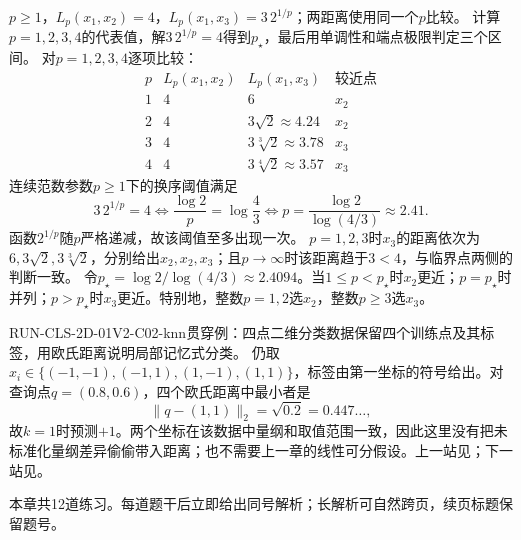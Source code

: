 \label{struct:V2-C02-CH33}
\begin{solution}
\SolGiven $p\ge1$，$L_p(x_1,x_2)=4$，$L_p(x_1,x_3)=3\,2^{1/p}$；两距离使用同一个$p$比较。
\SolPlan 计算$p=1,2,3,4$的代表值，解$3\,2^{1/p}=4$得到$p_\star$，最后用单调性和端点极限判定三个区间。
\SolDerive
对$p=1,2,3,4$逐项比较：
\[
\begin{array}{c|c|c|c}
p&L_p(x_1,x_2)&L_p(x_1,x_3)&\text{较近点}\\ \hline
1&4&6&x_2\\
2&4&3\sqrt2\approx4.24&x_2\\
3&4&3\sqrt[3]{2}\approx3.78&x_3\\
4&4&3\sqrt[4]{2}\approx3.57&x_3
\end{array}
\]
连续范数参数$p\geq 1$下的换序阈值满足
\[
3\,2^{1/p}=4
\Longleftrightarrow
\frac{\log2}{p}=\log\frac43
\Longleftrightarrow
p=\frac{\log2}{\log(4/3)}\approx2.41.
\]
函数$2^{1/p}$随$p$严格递减，故该阈值至多出现一次。
\SolCheck $p=1,2,3$时$x_3$的距离依次为$6,3\sqrt2,3\sqrt[3]2$，分别给出$x_2,x_2,x_3$；且$p\to\infty$时该距离趋于$3<4$，与临界点两侧的判断一致。
\SolAnswer 令$p_\star=\log2/\log(4/3)\approx2.4094$。当$1\le p<p_\star$时$x_2$更近；$p=p_\star$时并列；$p>p_\star$时$x_3$更近。特别地，整数$p=1,2$选$x_2$，整数$p\ge3$选$x_3$。
\end{solution}

\begin{SLRunningExample}{RUN-CLS-2D-01}{V2-C02-knn}{贯穿例：四点二维分类数据}{保留四个训练点及其标签，用欧氏距离说明局部记忆式分类。}
仍取$x_i\in\{(-1,-1),(-1,1),(1,-1),(1,1)\}$，标签由第一坐标的符号给出。对查询点$q=(0.8,0.6)$，四个欧氏距离中最小者是
\[
\lVert q-(1,1)\rVert_2=\sqrt{0.2}=0.447\ldots,
\]
故$k=1$时预测$+1$。两个坐标在该数据中量纲和取值范围一致，因此这里没有把未标准化量纲差异偷偷带入距离；\kNN{}也不需要上一章的线性可分假设。上一站见；下一站见。
\end{SLRunningExample}


\label{struct:V2-C02-CH34}
\begin{chapterexercisebox}
\label{struct:V2-C02-CH35}
本章共12道练习。每道题干后立即给出同号解析；长解析可自然跨页，续页标题保留题号。
\end{chapterexercisebox}

